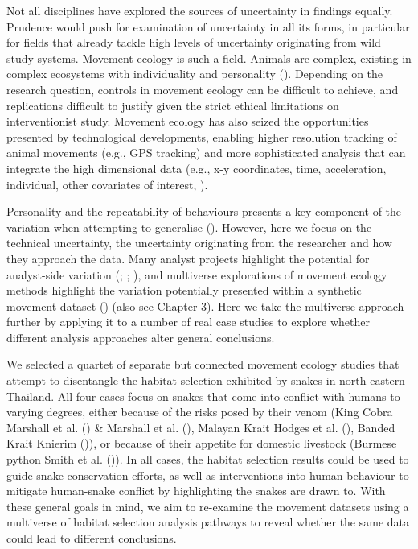 \documentclass[10pt,a4paper]{article}
\begin{document}
Not all disciplines have explored the sources of uncertainty in findings equally.
Prudence would push for examination of uncertainty in all its forms, in particular for fields that already tackle high levels of uncertainty originating from wild study systems.
Movement ecology is such a field.
Animals are complex, existing in complex ecosystems with individuality and personality ().
Depending on the research question, controls in movement ecology can be difficult to achieve, and replications difficult to justify given the strict ethical limitations on interventionist study.
Movement ecology has also seized the opportunities presented by technological developments, enabling higher resolution tracking of animal movements (e.g., GPS tracking) and more sophisticated analysis that can integrate the high dimensional data (e.g., x-y coordinates, time, acceleration, individual, other covariates of interest, ).

Personality and the repeatability of behaviours presents a key component of the variation when attempting to generalise ().
However, here we focus on the technical uncertainty, the uncertainty originating from the researcher and how they approach the data.
Many analyst projects highlight the potential for analyst-side variation (; ; ), and multiverse explorations of movement ecology methods highlight the variation potentially presented within a synthetic movement dataset () (also see Chapter 3).
Here we take the multiverse approach further by applying it to a number of real case studies to explore whether different analysis approaches alter general conclusions.

We selected a quartet of separate but connected movement ecology studies that attempt to disentangle the habitat selection exhibited by snakes in north-eastern Thailand.
All four cases focus on snakes that come into conflict with humans to varying degrees, either because of the risks posed by their venom (King Cobra Marshall et al. () \& Marshall et al. (), Malayan Krait Hodges et al. (), Banded Krait Knierim ()), or because of their appetite for domestic livestock (Burmese python Smith et al. ()).
In all cases, the habitat selection results could be used to guide snake conservation efforts, as well as interventions into human behaviour to mitigate human-snake conflict by highlighting the snakes are drawn to.
With these general goals in mind, we aim to re-examine the movement datasets using a multiverse of habitat selection analysis pathways to reveal whether the same data could lead to different conclusions.
\end{document}
